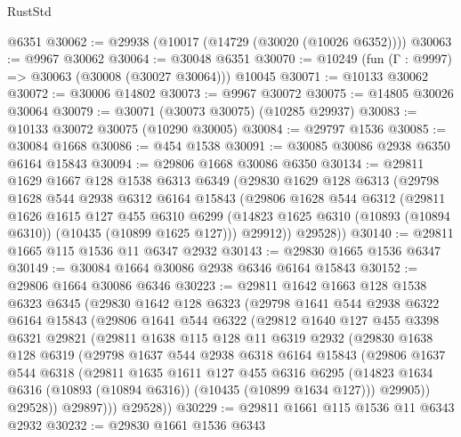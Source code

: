 \begin{lexlean}{RustStd}
\begin{coremodule}
    @6351
@30062 := @29938 (@10017 (@14729 (@30020 (@10026 @6352))))
@30063 := @9967 @30062
@30064 := @30048 @6351
@30070 := @10249 (fun (Γ : @9997) => @30063 (@30008 (@30027 @30064))) @10045
@30071 := @10133 @30062
@30072 := @30006 @14802
@30073 := @9967 @30072
@30075 := @14805 @30026 @30064
@30079 := @30071 (@30073 @30075) (@10285 @29937)
@30083 := @10133 @30072 @30075 (@10290 @30005)
@30084 := @29797 @1536
@30085 := @30084 @1668
@30086 := @454 @1538
@30091 := @30085 @30086 @2938 @6350 @6164 @15843
@30094 := @29806 @1668 @30086 @6350
@30134 := @29811
    @1629
    @1667
    @128
    @1538
    @6313
    @6349
    (@29830
      @1629
      @128
      @6313
      (@29798
        @1628
        @544
        @2938
        @6312
        @6164
        @15843
        (@29806
          @1628
          @544
          @6312
          (@29811
            @1626
            @1615
            @127
            @455
            @6310
            @6299
            (@14823 @1625 @6310 (@10893 (@10894 @6310)) (@10435 (@10899 @1625 @127)))
            @29912))
        @29528))
@30140 := @29811 @1665 @115 @1536 @11 @6347 @2932
@30143 := @29830 @1665 @1536 @6347
@30149 := @30084 @1664 @30086 @2938 @6346 @6164 @15843
@30152 := @29806 @1664 @30086 @6346
@30223 := @29811
    @1642
    @1663
    @128
    @1538
    @6323
    @6345
    (@29830
      @1642
      @128
      @6323
      (@29798
        @1641
        @544
        @2938
        @6322
        @6164
        @15843
        (@29806
          @1641
          @544
          @6322
          (@29812
            @1640
            @127
            @455
            @3398
            @6321
            @29821
            (@29811
              @1638
              @115
              @128
              @11
              @6319
              @2932
              (@29830
                @1638
                @128
                @6319
                (@29798
                  @1637
                  @544
                  @2938
                  @6318
                  @6164
                  @15843
                  (@29806
                    @1637
                    @544
                    @6318
                    (@29811
                      @1635
                      @1611
                      @127
                      @455
                      @6316
                      @6295
                      (@14823 @1634 @6316 (@10893 (@10894 @6316)) (@10435 (@10899 @1634 @127)))
                      @29905))
                  @29528))
              @29897)))
        @29528))
@30229 := @29811 @1661 @115 @1536 @11 @6343 @2932
@30232 := @29830 @1661 @1536 @6343

\end{coremodule}
\end{lexlean}
